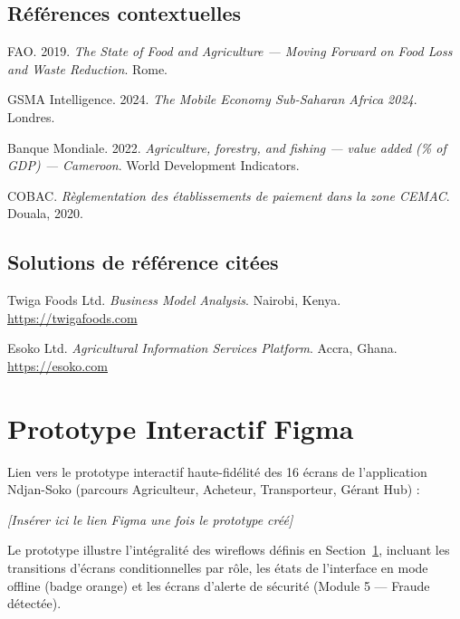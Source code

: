 \documentclass[12pt,a4paper]{report}
\begin{document}
\section*{Références contextuelles}

\begin{enumerate}[label={[\arabic*]}, start=8]
  \item FAO. 2019. \textit{The State of Food and Agriculture — Moving Forward on Food Loss and Waste Reduction}. Rome.
  \item GSMA Intelligence. 2024. \textit{The Mobile Economy Sub-Saharan Africa 2024}. Londres.
  \item Banque Mondiale. 2022. \textit{Agriculture, forestry, and fishing — value added (\% of GDP) — Cameroon}. World Development Indicators.
  \item COBAC. \textit{Règlementation des établissements de paiement dans la zone CEMAC}. Douala, 2020.
\end{enumerate}

\section*{Solutions de référence citées}

\begin{enumerate}[label={[\arabic*]}, start=12]
  \item Twiga Foods Ltd. \textit{Business Model Analysis}. Nairobi, Kenya. \url{https://twigafoods.com}
  \item Esoko Ltd. \textit{Agricultural Information Services Platform}. Accra, Ghana. \url{https://esoko.com}
\end{enumerate}

\appendix

\chapter{Prototype Interactif Figma}

Lien vers le prototype interactif haute-fidélité des 16 écrans de l'application Ndjan-Soko (parcours Agriculteur, Acheteur, Transporteur, Gérant Hub) :

\textit{[Insérer ici le lien Figma une fois le prototype créé]}

Le prototype illustre l'intégralité des wireflows définis en Section~\ref{}, incluant les transitions d'écrans conditionnelles par rôle, les états de l'interface en mode offline (badge orange) et les écrans d'alerte de sécurité (Module 5 — Fraude détectée).
\end{document}
